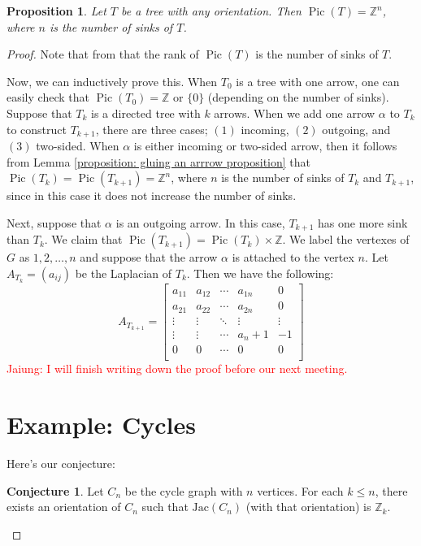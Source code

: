 \documentclass[11pt,reqno]{amsart}
\DeclareMathOperator{\Pic}{Pic}
\newcommand{\Jac}{\textrm{Jac}}{}
\theoremstyle{definition}
\newtheorem{conj}[mydef]{\textbf{Conjecture}}
\theoremstyle{plain}
\newtheorem{pro}[mydef]{\textbf{Proposition}}
\begin{document}
\begin{pro}
Let $T$ be a tree with any orientation. Then $\Pic(T)=\mathbb{Z}^n$, where $n$ is the number of sinks of $T$. 
\end{pro}
\begin{proof}

Note that from \cite[Corollary 3.5]{wagner2000critical} that the rank of $\Pic(T)$ is the number of sinks of $T$.

Now, we can inductively prove this. When $T_0$ is a tree with one arrow, one can easily check that $\Pic(T_0) =\mathbb{Z}$ or $\{0\}$ (depending on the number of sinks). Suppose that $T_k$ is a directed tree with $k$ arrows. When we add one arrow $\alpha$ to $T_k$ to construct $T_{k+1}$, there are three cases; $(1)$ incoming, $(2)$ outgoing, and $(3)$ two-sided. When $\alpha$ is either incoming or two-sided arrow, then it follows from Lemma \ref{proposition: gluing an arrrow proposition} that $\Pic(T_k)=\Pic(T_{k+1})=\mathbb{Z}^n$, where $n$ is the number of sinks of $T_k$ and $T_{k+1}$, since in this case it does not increase the number of sinks. 

Next, suppose that $\alpha$ is an outgoing arrow. In this case, $T_{k+1}$ has one more sink than $T_{k}$. We claim that $\Pic(T_{k+1})=\Pic(T_k)\times \mathbb{Z}$. We label the vertexes of $G$ as $1,2,\dots,n$ and suppose that the arrow $\alpha$ is attached to the vertex $n$. Let $A_{T_k}=(a_{ij})$ be the Laplacian of $T_k$. Then we have the following:
\begin{equation}\label{eq: tree case}
	A_{T_{k+1}}=\left[\begin{array}{ccc|c|c}
		a_{11}&a_{12}&\cdots &a_{1n}&0\\
		a_{21}&a_{22}&\cdots &a_{2n}&0\\
		\vdots & \vdots &\ddots & \vdots & \vdots \\ \hline
		\vdots & \vdots & \cdots&a_n+1 & -1\\ \hline
		0&0&\cdots &0&0\\
	\end{array}\right]
\end{equation}
 \textcolor{red}{Jaiung: I will finish writing down the proof before our next meeting.}
	
\section{Example: Cycles}

Here's our conjecture:
\begin{conj}
Let $C_n$ be the cycle graph with $n$ vertices. For each $k \leq n$, there exists an orientation of $C_n$ such that $\Jac(C_n)$ (with that orientation) is $\mathbb{Z}_k$.
\end{conj}


\end{proof}
\end{document}
